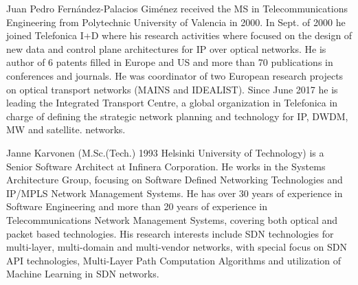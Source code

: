 \documentclass[10pt, conference]{IEEEtran}
\begin{document}
\begin{IEEEbiography}%
{Juan Pedro Fernández-Palacios Giménez} received the MS in Telecommunications Engineering from Polytechnic University of Valencia in 2000. In Sept. of 2000 he joined Telefonica I+D where his research activities where focused on the design of new data and control plane architectures for IP over optical networks. He is author of 6 patents filled in Europe and US and more than 70 publications in conferences and journals. He was coordinator of two European research projects on optical transport networks (MAINS and IDEALIST). Since June 2017 he is leading the Integrated Transport Centre, a global organization in Telefonica in charge of defining the strategic network planning and technology for IP, DWDM, MW and satellite. networks.\end{IEEEbiography}

\begin{IEEEbiography}%
{Janne Karvonen} (M.Sc.(Tech.) 1993 Helsinki University of Technology) is a Senior Software Architect at Infinera Corporation. He works in the Systems Architecture Group, focusing on Software Defined Networking Technologies and IP/MPLS Network Management Systems. He has over 30 years of experience in Software Engineering and more than 20 years of experience in Telecommunications Network Management Systems, covering both optical and packet based technologies. His research interests include SDN technologies for multi-layer, multi-domain and multi-vendor networks, with special focus on SDN API technologies, Multi-Layer Path Computation Algorithms and utilization of Machine Learning in SDN networks.\end{IEEEbiography}
\end{document}
